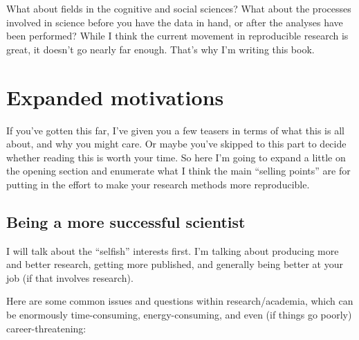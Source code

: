 \documentclass{book}
\begin{document}
What about fields in the cognitive and social sciences?  What about the processes involved in science before you have the data in hand, or after the analyses have been performed?  While I think the current movement in reproducible research is great, it doesn't go nearly far enough. That's why I'm writing this book.
\section{Expanded motivations}
\label{sec-2-3}

If you've gotten this far, I've given you a few teasers in terms of what this is all about, and why you might care.  Or maybe you've skipped to this part to decide whether reading this is worth your time.  So here I'm going to expand a little on the opening section and enumerate what I think the main ``selling points'' are for putting in the effort to make your research methods more reproducible.
\subsection{Being a more successful scientist}
\label{sec-2-3-1}
\label{success}

I will talk about the ``selfish'' interests first. I'm talking about producing more and better research, getting more published, and generally being better at your job (if that involves research).

Here are some common issues and questions within research/academia, which can be enormously time-consuming, energy-consuming, and even (if things go poorly) career-threatening:
\end{document}
